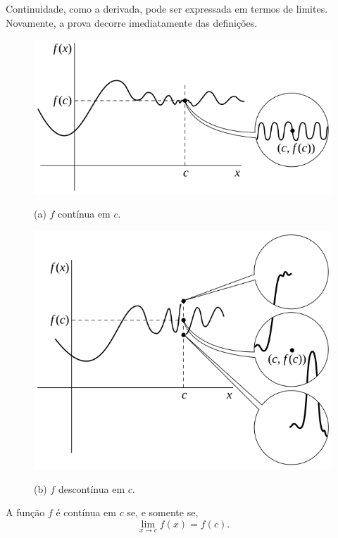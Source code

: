 Continuidade, como a derivada, pode ser expressada em termos de limites.
Novamente, a prova decorre imediatamente das definições.

\begin{figure}
\begin{center}
\includegraphics{continuitygraph-a}

(a) $f$ contínua em $c$.

\includegraphics{continuitygraph-b}

(b) $f$ descontínua em $c$.
\end{center}
\caption{}\label{fig:continuitygraph}
\end{figure}

\begin{theorem}
A função $f$ é contínua em $c$ se, e somente se,
$$
  \lim_{x \to c} f(x) = f(c).
$$
\end{theorem}

